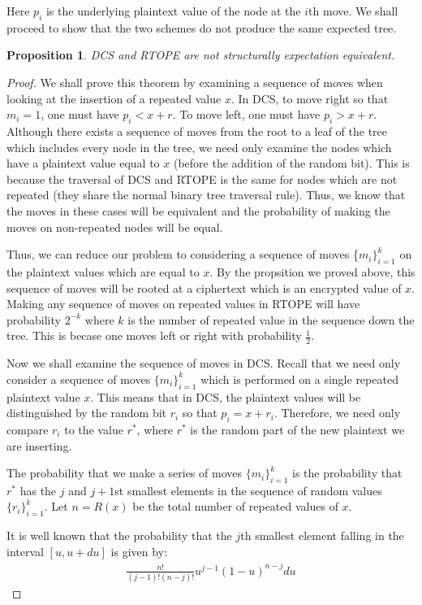 \documentclass[12pt]{article}
\newtheorem{proposition}[theorem]{Proposition}
\begin{document}
Here $p_i$ is the underlying plaintext value of the node at the $i$th move. We shall proceed to show that the two schemes do not produce the same expected tree. \\
\begin{proposition}
    DCS and RTOPE are not structurally expectation equivalent.
\end{proposition}
\begin{proof}
We shall prove this theorem by examining a sequence of moves when looking at the insertion of a repeated value $x$. In DCS, to move right so that $m_i = 1$, one must have $p_i < x + r$. To move left, one must have $p_i > x + r$. Although there exists a sequence of moves from the root to a leaf of the tree which includes every node in the tree, we need only examine the nodes which have a plaintext value equal to $x$ (before the addition of the random bit). This is because the traversal of DCS and RTOPE is the same for nodes which are not repeated (they share the normal binary tree traversal rule). Thus, we know that the moves in these cases will be equivalent and the probability of making the moves on non-repeated nodes will be equal.

Thus, we can reduce our problem to considering a sequence of moves \{$m_i\}_{i=1}^k$ on the plaintext values which are equal to $x$. By the propsition we proved above, this sequence of moves will be rooted at a ciphertext which is an encrypted value of $x$. Making any sequence of moves on repeated values in RTOPE will have probability $2^{-k}$ where $k$ is the number of repeated value in the sequence down the tree. This is becase one moves left or right with probability $\frac{1}{2}$.

Now we shall examine the sequence of moves in DCS. Recall that we need only consider a sequence of moves $\{m_i\}_{i=1}^k$ which is performed on a single repeated plaintext value $x$. This means that in DCS, the plaintext values will be distinguished by the random bit $r_i$ so that $p_i = x + r_i$. Therefore, we need only compare $r_i$ to the value $r^*$, where $r^*$ is the random part of the new plaintext we are inserting.

The probability that we make a series of moves $\{m_i\}_{i=1}^k$ is the probability that $r^*$ has the $j$ and $j+1$st smallest elements in the sequence of random values $\{ r_i\}_{i=1}^k$. Let $n = R(x)$ be the total number of repeated values of $x$.

It is well known that the probability that the $j$th smallest element falling in the interval $[u, u + du]$ is given by:
    \begin{eqnarray}
      \frac{n!}{(j-1)!(n-j)!} u^{j-1} (1-u)^{n-j} du
    \end{eqnarray}


\end{proof}
\end{document}

